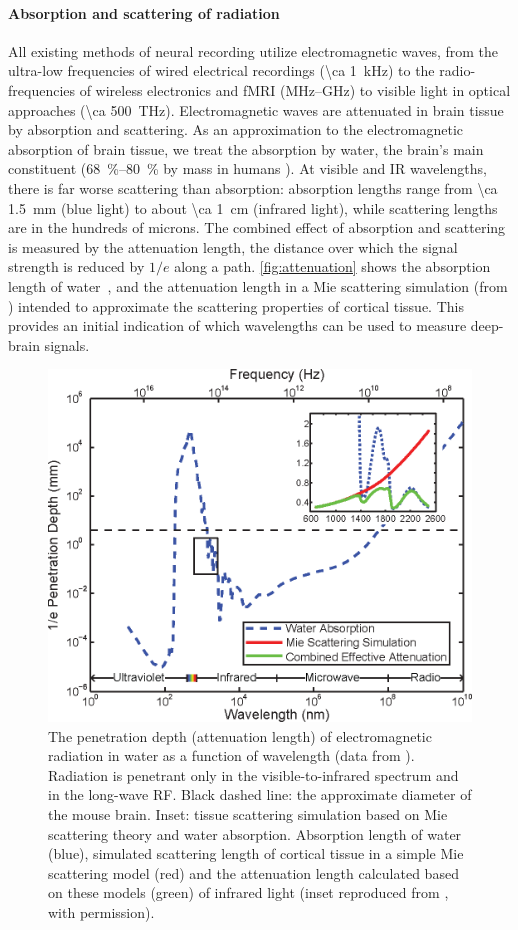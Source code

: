 \paragraph{Absorption and scattering of radiation}
All existing methods of neural recording utilize electromagnetic waves, from the ultra-low frequencies of wired electrical recordings (\SI{\ca 1}{\kilo\hertz}) to the radio-frequencies of wireless electronics and fMRI (MHz--GHz) to visible light in optical approaches (\SI{\ca 500}{\tera\hertz}).
Electromagnetic waves are attenuated in brain tissue by absorption and scattering.
As an approximation to the electromagnetic absorption of brain tissue, we treat the absorption by water, the brain's main constituent (\SIrange{68}{80}{\percent} by mass in humans \cite{dobbing73,fatouros99}).
At visible and IR wavelengths, there is far worse scattering than absorption: absorption lengths range from \SI{\ca 1.5}{\milli\meter} (blue light) to about \SI{\ca 1}{\centi\meter} (infrared light), while scattering lengths are in the hundreds of microns.
The combined effect of absorption and scattering is measured by the attenuation length, the distance over which the signal strength is reduced by $1/e$ along a path.
\autoref{fig:attenuation} shows the absorption length of water~\cite{kou93}, and the attenuation length in a Mie scattering simulation (from \cite{horton13}) intended to approximate the scattering properties of cortical tissue.
This provides an initial indication of which wavelengths can be used to measure deep-brain signals.

\begin{figure}[htbp]
\caption{%
The penetration depth (attenuation length) of electromagnetic radiation in water as a function of wavelength (data from \cite{jonasz07}).
Radiation is penetrant only in the visible-to-infrared spectrum and in the long-wave RF.
Black dashed line: the approximate diameter of the mouse brain.
Inset: tissue scattering simulation based on Mie scattering theory and water absorption. Absorption length of water~\cite{kou93} (blue), simulated scattering length of cortical tissue in a simple Mie scattering model (red) and the attenuation length calculated based on these models (green) of infrared light (inset reproduced from \cite{kou93}, with permission).}
\label{fig:attenuation}
\centering
\includegraphics[width=0.65\linewidth]{figs/Fig2.eps}
\end{figure}

